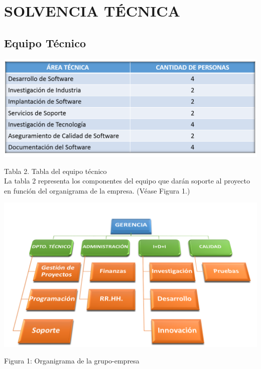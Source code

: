 \documentclass[11pt,letterpaper]{report}
\begin{document}
\chapter{ SOLVENCIA T\'ECNICA }
\section{Equipo T\'ecnico}

\begin{center}
\includegraphics[scale=0.6]{img/tabla_personal.png}
\end{center}

Tabla 2. Tabla del equipo técnico\\
La tabla 2 representa los componentes del equipo que darán soporte al proyecto en función del organigrama de la empresa. (Véase Figura 1.)

\begin{center}
\includegraphics[scale=0.75]{img/diagrama_jerarquico.png}
\end{center}
\begin{center}
Figura 1: Organigrama de la grupo-empresa
\end{center}
\end{document}
